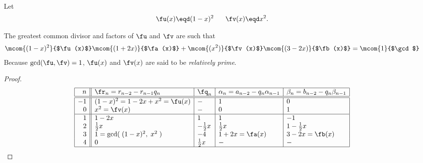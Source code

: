 \begin{example}
\label{ex:eea_n=2}
Let
  \[ \fu(x)\eqd (1-x)^2  \hspace{4ex} \fv(x)\eqd x^2. \]

The greatest common divisor and factors of $\fu$ and $\fv$ are such that
\[
   \mcom{(1-x)^2}{$\fu(x)$} \mcom{(1+2x)}{$\fa(x)$}   +
   \mcom{(x^2)  }{$\fv(x)$} \mcom{(3-2x)}{$\fb(x)$} =
   \mcom{1}{$\gcd$}
\]
Because $\gcd(\fu,\fv)=1$, $\fu(x)$ and $\fv(x)$ are said to be
{\em relatively prime}.
\end{example}
\begin{proof}
\[\begin{array}{|r||l|l|l|l|}
  \hline
  n  & \fr_n=r_{n-2}-r_{n-1}q_n  & \fq_n   & \alpha_n=a_{n-2}-q_n \alpha_{n-1} & \beta_n=b_{n-2}-q_n \beta_{n-1}  \\
  \hline
  \hline
  -1  & (1-x)^2=1-2x+x^2 = \fu(x)
      & -
      & 1
      & 0
      \\
   0  & x^2 = \fv(x)
      & -
      & 0
      & 1
      \\
  \hline
   1  & 1-2x
      &  1
      &  1
      & -1
      \\
   2  &  \frac{1}{2}x
      & -\frac{1}{2}x
      &  \frac{1}{2}x
      & 1-\frac{1}{2}x
      \\
   3  & 1    = \gcd(\;(1-x)^2,\;x^2\;)
      & -4
      & 1+2x = \fa(x)
      & 3-2x = \fb(x)
      \\
   4  & 0
      & \frac{1}{2}x
      & -
      & -
      \\
  \hline
\end{array}\]
\end{proof}







